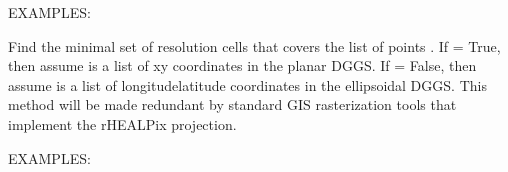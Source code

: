 \documentclass[a4paper,12ptopenany,oneside,english]{sphinxmanual}
\begin{document}
\begin{fulllineitems}
\begin{fulllineitems}
\sphinxAtStartPar
EXAMPLES:

\begin{sphinxVerbatim}[commandchars=\\\{\}]
  
   
  
\PYG{p}{[}     \PYG{p}{]}
\end{sphinxVerbatim}

\end{fulllineitems}


\begin{fulllineitems}
\label{\detokenize{dggs:rhealpixdggs.dggs.RHEALPixDGGS.minimal_cover}}
\pysigstartsignatures
{}
\pysigstopsignatures
\sphinxAtStartPar
Find the minimal set of resolution  cells that covers
the list of points .
If  = True, then assume  is a list of x\sphinxhyphen{}y
coordinates in the planar DGGS.
If  = False, then assume  is a list of
longitude\sphinxhyphen{}latitude coordinates in the ellipsoidal DGGS.
This method will be made redundant by standard GIS rasterization
tools that implement the rHEALPix projection.

\sphinxAtStartPar
EXAMPLES:


\end{fulllineitems}
\end{fulllineitems}
\end{document}
